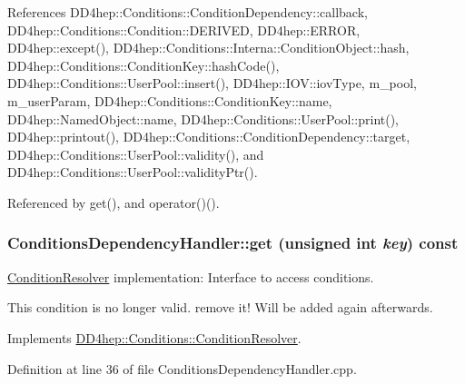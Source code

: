 References DD4hep::Conditions::ConditionDependency::callback, DD4hep::Conditions::Condition::DERIVED, DD4hep::ERROR, DD4hep::except(), DD4hep::Conditions::Interna::ConditionObject::hash, DD4hep::Conditions::ConditionKey::hashCode(), DD4hep::Conditions::UserPool::insert(), DD4hep::IOV::iovType, m\_\-pool, m\_\-userParam, DD4hep::Conditions::ConditionKey::name, DD4hep::NamedObject::name, DD4hep::Conditions::UserPool::print(), DD4hep::printout(), DD4hep::Conditions::ConditionDependency::target, DD4hep::Conditions::UserPool::validity(), and DD4hep::Conditions::UserPool::validityPtr().

Referenced by get(), and operator()().\hypertarget{class_d_d4hep_1_1_conditions_1_1_conditions_dependency_handler_aff162f6a84d33587bce982b60b259d14}{
\subsubsection[{get}]{ ConditionsDependencyHandler::get (unsigned int {\em key}) const}}
\label{class_d_d4hep_1_1_conditions_1_1_conditions_dependency_handler_aff162f6a84d33587bce982b60b259d14}


\hyperlink{class_d_d4hep_1_1_conditions_1_1_condition_resolver}{ConditionResolver} implementation: Interface to access conditions. 

This condition is no longer valid. remove it! Will be added again afterwards. 

Implements \hyperlink{class_d_d4hep_1_1_conditions_1_1_condition_resolver_ac321d32bbe1d5e777859c2490c68b571}{DD4hep::Conditions::ConditionResolver}.

Definition at line 36 of file ConditionsDependencyHandler.cpp.

